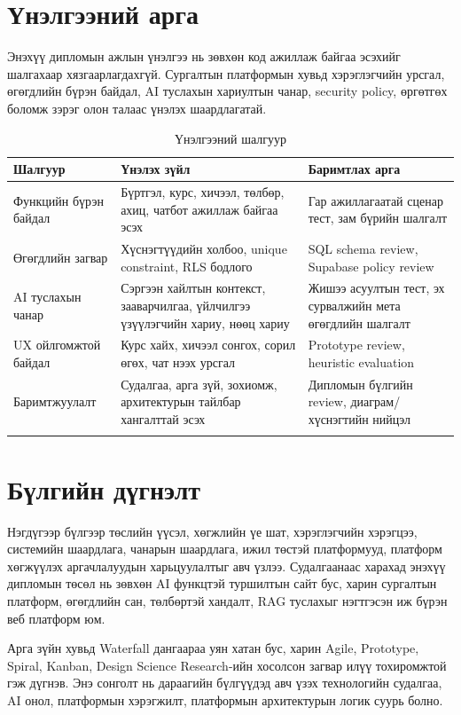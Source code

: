 \section{Үнэлгээний арга}
Энэхүү дипломын ажлын үнэлгээ нь зөвхөн код ажиллаж байгаа эсэхийг шалгахаар хязгаарлагдахгүй. Сургалтын платформын хувьд хэрэглэгчийн урсгал, өгөгдлийн бүрэн байдал, AI туслахын хариултын чанар, security policy, өргөтгөх боломж зэрэг олон талаас үнэлэх шаардлагатай.

\begin{longtable}{|p{}|p{}|p{}|}
  \hline
  \textbf{Шалгуур} & \textbf{Үнэлэх зүйл} & \textbf{Баримтлах арга} \\ \hline
  Функцийн бүрэн байдал & Бүртгэл, курс, хичээл, төлбөр, ахиц, чатбот ажиллаж байгаа эсэх & Гар ажиллагаатай сценар тест, зам бүрийн шалгалт \\ \hline
  Өгөгдлийн загвар & Хүснэгтүүдийн холбоо, unique constraint, RLS бодлого & SQL schema review, Supabase policy review \\ \hline
  AI туслахын чанар & Сэргээн хайлтын контекст, зааварчилгаа, үйлчилгээ үзүүлэгчийн хариу, нөөц хариу & Жишээ асуултын тест, эх сурвалжийн мета өгөгдлийн шалгалт \\ \hline
  UX ойлгомжтой байдал & Курс хайх, хичээл сонгох, сорил өгөх, чат нээх урсгал & Prototype review, heuristic evaluation \\ \hline
  Баримтжуулалт & Судалгаа, арга зүй, зохиомж, архитектурын тайлбар хангалттай эсэх & Дипломын бүлгийн review, диаграм/хүснэгтийн нийцэл \\ \hline
  \caption{Үнэлгээний шалгуур}
  \label{tab:evaluation-criteria}
\end{longtable}

\section*{Бүлгийн дүгнэлт}
Нэгдүгээр бүлгээр төслийн үүсэл, хөгжлийн үе шат, хэрэглэгчийн хэрэгцээ, системийн шаардлага, чанарын шаардлага, ижил төстэй платформууд, платформ хөгжүүлэх аргачлалуудын харьцуулалтыг авч үзлээ. Судалгаанаас харахад энэхүү дипломын төсөл нь зөвхөн AI функцтэй туршилтын сайт бус, харин сургалтын платформ, өгөгдлийн сан, төлбөртэй хандалт, RAG туслахыг нэгтгэсэн иж бүрэн веб платформ юм.

Арга зүйн хувьд Waterfall дангаараа уян хатан бус, харин Agile, Prototype, Spiral, Kanban, Design Science Research-ийн хосолсон загвар илүү тохиромжтой гэж дүгнэв. Энэ сонголт нь дараагийн бүлгүүдэд авч үзэх технологийн судалгаа, AI онол, платформын хэрэгжилт, платформын архитектурын логик суурь болно.
